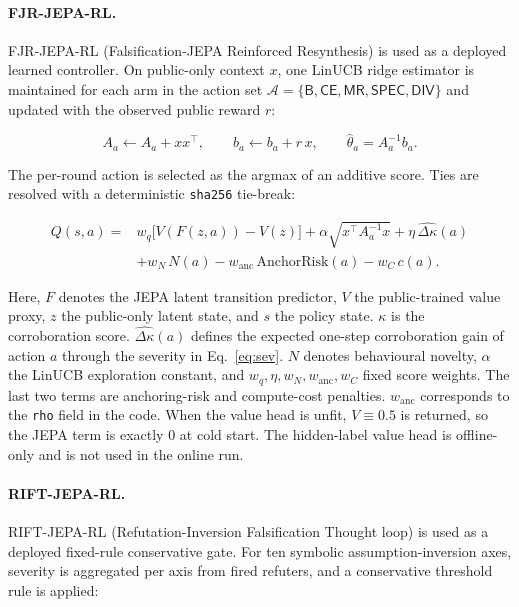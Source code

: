 \documentclass{article}
\numberwithin{equation}{section}  %
\theoremstyle{definition}
\newcommand{\armB}{\textsf{B}}
\begin{document}
\paragraph{FJR-JEPA-RL.}
FJR-JEPA-RL (Falsification-JEPA Reinforced Resynthesis) is used as a deployed learned
controller. On public-only context $x$, one LinUCB ridge estimator is maintained for each arm
in the action set
$\mathcal{A}=\{\armB,\textsf{CE},\textsf{MR},\textsf{SPEC},\textsf{DIV}\}$ and updated with
the observed public reward $r$:

\begin{equation}\label{eq:fjr-linucb}
A_a \leftarrow A_a + x x^\top,\qquad
b_a \leftarrow b_a + r\,x,\qquad
\hat{\theta}_a = A_a^{-1} b_a .
\end{equation}

The per-round action is selected as the argmax of an additive score. Ties are resolved with
a deterministic \texttt{sha256} tie-break:

\begin{equation}\label{eq:fjr-score}
\begin{aligned}
Q(s,a)={}&w_q\bigl[V(F(z,a))-V(z)\bigr]
+\alpha\sqrt{x^\top A_a^{-1} x}
+\eta\,\widehat{\Delta\kappa}(a)\\
&+w_N\,N(a)
-w_{\mathrm{anc}}\,\mathrm{AnchorRisk}(a)
-w_C\,c(a).
\end{aligned}
\end{equation}

Here, $F$ denotes the JEPA latent transition predictor, $V$ the public-trained value proxy,
$z$ the public-only latent state, and $s$ the policy state. $\kappa$ is the corroboration
score. $\widehat{\Delta\kappa}(a)$ defines the expected one-step corroboration gain of action
$a$ through the severity in Eq.~\eqref{eq:sev}. $N$ denotes behavioural novelty, $\alpha$ the
LinUCB exploration constant, and $w_q,\eta,w_N,w_{\mathrm{anc}},w_C$ fixed score weights. The
last two terms are anchoring-risk and compute-cost penalties. $w_{\mathrm{anc}}$ corresponds
to the \texttt{rho} field in the code. When the value head is unfit, $V\equiv 0.5$ is returned,
so the JEPA term is exactly $0$ at cold start. The hidden-label value head is offline-only and
is not used in the online run.

\paragraph{RIFT-JEPA-RL.}
RIFT-JEPA-RL (Refutation-Inversion Falsification Thought loop) is used as a deployed
fixed-rule conservative gate. For ten symbolic assumption-inversion axes, severity is
aggregated per axis from fired refuters, and a conservative threshold rule is applied:
\end{document}
